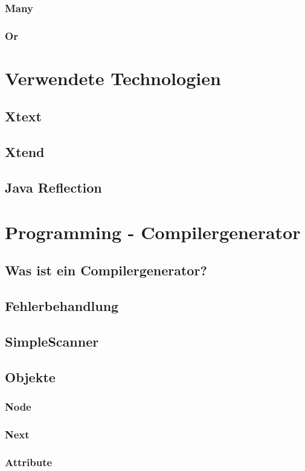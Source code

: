 \documentclass[a4paper,12pt,titlepage]{article}
\begin{document}
\subsubsection{Many}
\subsubsection{Or}
\section{Verwendete Technologien}
\subsection{Xtext}
\subsection{Xtend}
\subsection{Java Reflection}
\section{Programming - Compilergenerator}
\subsection{Was ist ein Compilergenerator?}
\subsection{Fehlerbehandlung}
\subsection{SimpleScanner}
\subsection{Objekte}
\subsubsection{Node}
\subsubsection{Next}
\subsubsection{Attribute}
\end{document}
